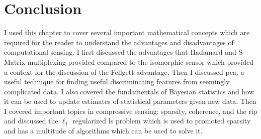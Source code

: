\section{Conclusion}

I used this chapter to cover several important mathematical concepts which are required for the reader to understand the advantages and disadvantages of computational sensing. I first discussed the advantages that Hadamard and S-Matrix multiplexing provided compared to the isomorphic sensor which provided a context for the discussion of the Fellgett advantage. Then I discussed \acrfull{pca}, a useful technique for finding useful discriminating features from seemingly complicated data. I also covered the fundamentals of Bayesian statistics and how it can be used to update estimates of statistical parameters given new data. Then I covered important topics in compressive sensing: sparsity, coherence, and the \acrfull{rip} and discussed the $\ell_1$ regularized \gls{ls} problem which is used to promoted sparsity and has a multitude of algorithms which can be used to solve it. 


%  
%



